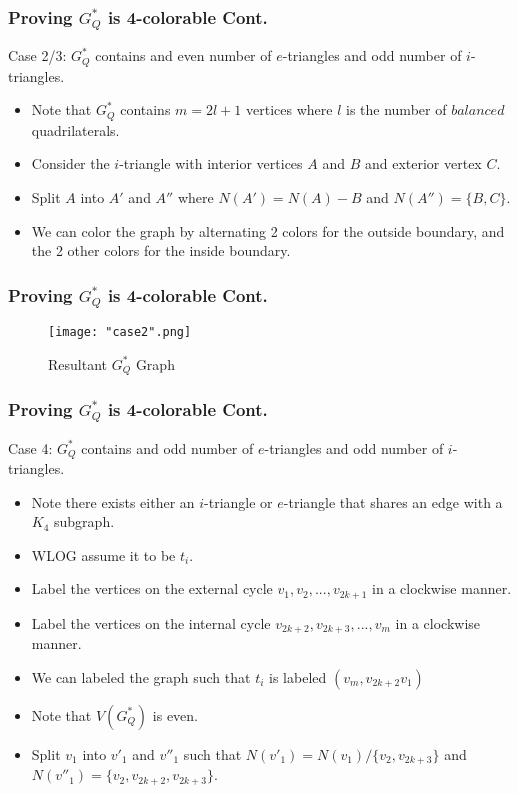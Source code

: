 \documentclass{beamer}
\begin{document}
\begin{frame}
\frametitle{Proving $G^{*}_Q$ is 4-colorable Cont.}
Case 2/3: $G^{*}_Q$ contains and even number of $e$-triangles and odd number of $i$-triangles.  
\begin{itemize}
	\item Note that $G^{*}_Q$ contains $m = 2l +1$ vertices where $l$ is the number of $balanced$ quadrilaterals.
	\item Consider the $i$-triangle with interior vertices $A$ and $B$ and exterior vertex $C$.
	\item Split $A$ into $A'$ and $A''$ where $N(A') = N(A) - B$ and $N(A'') = \{B,C\}$. 
	\item We can color the graph by alternating 2 colors for the outside boundary, and the 2 other colors for the inside boundary. 
\end{itemize}
\end{frame}

\begin{frame}
\frametitle{Proving $G^{*}_Q$ is 4-colorable Cont.}
	\begin{center}
	\begin{figure}[H]
	\caption{Resultant $G^{*}_Q$ Graph}
	\centering
	\texttt{[image: "case2".png]}
	\end{figure}
	\end{center}
\end{frame}

\begin{frame}
\frametitle{Proving $G^{*}_Q$ is 4-colorable Cont.}
Case 4: $G^{*}_Q$ contains and odd number of $e$-triangles and odd number of $i$-triangles.  
\begin{itemize}
	\item Note there exists either an $i$-triangle or $e$-triangle that shares an edge with a $K_4$ subgraph.
	\item WLOG assume it to be $t_i$.
	\item Label the vertices on the external cycle $v_1,v_2,...,v_{2k+1}$ in a clockwise manner.
	\item Label the vertices on the internal cycle $v_{2k+2},v_{2k+3},...,v_{m}$ in a clockwise manner.
	\item We can labeled the graph such that $t_i$ is labeled $(v_m,v_{2k+2}v_1)$ 
	\item Note that $V(G^{*}_Q)$ is even.
	\item Split $v_1$ into $v'_1$ and $v''_1$ such that $N(v'_1) = N(v_1)/ \{v_2, v_{2k+3}\}$ and $N(v''_1) = \{v_2,v_{2k+2},v_{2k+3}\}$.
\end{itemize}
\end{frame}
\end{document}
